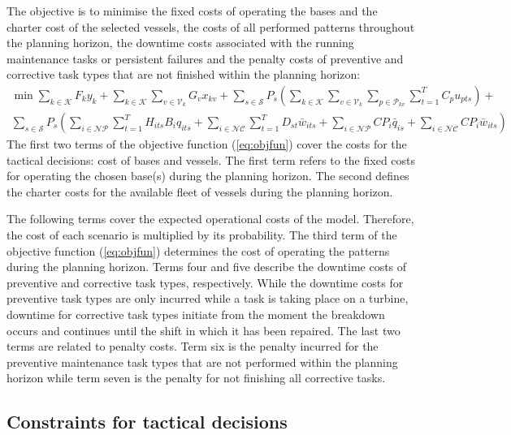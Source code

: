 The objective is to minimise the fixed costs of operating the bases and the charter cost of the selected vessels, the costs of all performed patterns throughout the planning horizon, the downtime costs associated with the running maintenance tasks or persistent failures and the penalty costs of preventive and corrective task types that are not finished within the planning horizon:
%
\begin{align}
\label{eq:objfun}
 \min  	\sum\limits_{k\in \mathcal{K}} F_k y_k  %
	      + \sum\limits_{k\in \mathcal{K}}\sum\limits_{v\in\mathcal{V}_k} G_v x_{kv} %
	      + \sum\limits_{s\in\mathcal{S}} P_{s} \left(\sum\limits_{k\in\mathcal{K}} \sum\limits_{v\in\mathcal{V}_k} \sum\limits_{p\in\mathcal{P}_{kv}} \sum\limits_{t=1}^T C_{p}u_{pts}\right) +\\ \nonumber
	     \sum\limits_{s\in\mathcal{S}} P_{s} \left(\sum\limits_{i\in \mathcal{NP}}  \sum\limits_{t=1}^TH_{its}B_{i}q_{its}
+ \sum\limits_{i \in\mathcal{NC}} \sum\limits_{t=1}^T D_{st} \bar{w}_{its} +  \sum\limits_{i \in\mathcal{NP}} CP_i \bar{q}_{is} + \sum\limits_{i \in\mathcal{NC}} CP_i \bar{w}_{its}\right)
\end{align}
%
The first two terms of the objective function (\ref{eq:objfun}) cover the costs for the tactical decisions: cost of bases and vessels. The first term refers to the fixed costs for operating the chosen base(s) during the  planning horizon. The second defines the charter costs for the available fleet of vessels during the  planning horizon.

The following terms cover the expected operational costs of the model. Therefore, the cost of each scenario is  multiplied by its probability. The third term of the objective function (\ref{eq:objfun}) determines the cost of operating the patterns during the planning horizon. Terms four and five describe the downtime costs of preventive and corrective task types, respectively. While the downtime costs for preventive task types are only incurred while a task is taking place on a turbine, downtime for corrective task types initiate from the moment the breakdown occurs and continues until the shift in which it has been repaired. The last two terms are related to penalty costs. Term six is the penalty incurred for the preventive maintenance task types that are not performed within the planning horizon while term seven is the penalty for not finishing all corrective tasks.



\subsection{Constraints for tactical decisions}

